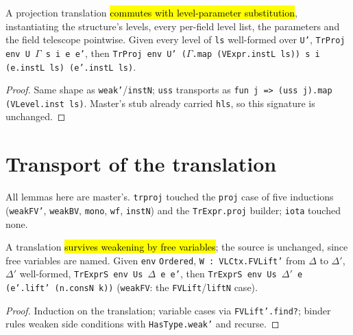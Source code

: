 \begin{theorem}
\label{thm:trproj-instl}
\leanok
{}
 

 A projection translation \hl{commutes with level-parameter substitution}, instantiating the structure's levels, every per-field level list, the parameters and the field telescope pointwise. Given every level of \texttt{ls} well-formed over \texttt{U'}, \texttt{TrProj env U $\Gamma$ s i e e'}, then \texttt{TrProj env U' ($\Gamma$.map (VExpr.instL ls)) s i (e.instL ls) (e'.instL ls)}.
\end{theorem}
\begin{proof}
\leanok
{} Same shape as \texttt{weak'}/\texttt{instN}; \texttt{uss} transports as \texttt{fun j => (uss j).map (VLevel.inst ls)}. Master's stub already carried \texttt{hls}, so this signature is unchanged.
\end{proof}

\section{Transport of the translation}

All lemmas here are master's. \texttt{trproj} touched the \texttt{proj} case of five inductions (\texttt{weakFV'}, \texttt{weakBV}, \texttt{mono}, \texttt{wf}, \texttt{instN}) and the \texttt{TrExpr.proj} builder; \texttt{iota} touched none.

\begin{theorem}
\label{thm:trexprs-weakfv}
\leanok
{}
 

 A translation \hl{survives weakening by free variables}; the source is unchanged, since free variables are named. Given \texttt{env} \texttt{Ordered}, \texttt{W : VLCtx.FVLift'} from $\Delta$ to $\Delta'$, $\Delta'$ well-formed, \texttt{TrExprS env Us $\Delta$ e e'}, then \texttt{TrExprS env Us $\Delta'$ e (e'.lift' (n.consN k))} (\texttt{weakFV}: the \texttt{FVLift}/\texttt{liftN} case).
\end{theorem}
\begin{proof}
\leanok
{} Induction on the translation; variable cases via \texttt{FVLift'.find?}; binder rules weaken side conditions with \texttt{HasType.weak'} and recurse.
\end{proof}

